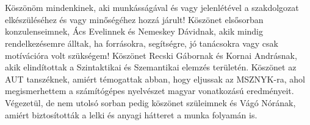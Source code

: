 \chapter*{\koszonetnyilvanitas}

Köszönöm mindenkinek, aki munkásságával és vagy jelenlétével a szakdolgozat elkészüléséhez és vagy minőségéhez hozzá járult! Köszönet elsősorban konzulenseimnek, Ács Evelinnek és Nemeskey Dávidnak, akik mindig rendelkezésemre álltak, ha forrásokra, segítségre, jó tanácsokra vagy csak motívációra volt szükségem! Köszönet Recski Gábornak és Kornai Andrásnak, akik elindítottak a Szintaktikai és Szemantikai elemzés területén. Köszönet az AUT tanszéknek, amiért témogattak abban, hogy eljussak az MSZNYK-ra, ahol megismerhettem a számítógépes nyelvészet magyar vonatkozású eredményeit. Végezetül, de nem utolsó sorban pedig köszönet szüleimnek és Vágó Nórának, amiért biztosították a lelki és anyagi hátteret a munka folyamán is.
